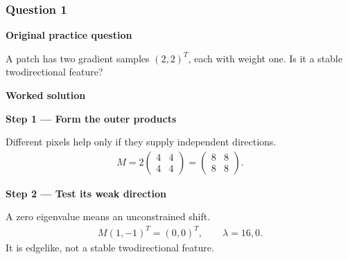 \documentclass[letterpaper,11pt,english,openany,oneside]{jupyterBook}
\begin{document}
\subsubsection{Question 1}
\label{\detokenize{lectures/lecture05/tldr:question-1}}
\par\medskip\textbf{Original practice question}\par\smallskip

\sphinxAtStartPar
A patch has two gradient samples \((2,2)^T\), each with weight one. Is it a stable two\sphinxhyphen{}directional feature?

\par\medskip

\par\medskip
\textbf{Worked solution}\par\smallskip

\par\medskip{}
{\color{QuizStepRed}\bfseries Step 1 — Form the outer products}\par\smallskip

\sphinxAtStartPar
{} Different pixels help only if they supply independent directions.
{\color{QuizMathBlue} \begin{equation*}
\begin{split}M=2\begin{pmatrix}4&4\\4&4\end{pmatrix}=\begin{pmatrix}8&8\\8&8\end{pmatrix}.\end{split}
\end{equation*}}
\par

\par\medskip{}
{\color{QuizStepRed}\bfseries Step 2 — Test its weak direction}\par\smallskip

\sphinxAtStartPar
{} A zero eigenvalue means an unconstrained shift.
{\color{QuizMathBlue} \begin{equation*}
\begin{split}M(1,-1)^T=(0,0)^T,\qquad\lambda=16,0.\end{split}
\end{equation*}}
\sphinxAtStartPar
It is edge\sphinxhyphen{}like, not a stable two\sphinxhyphen{}directional feature.
\end{document}
